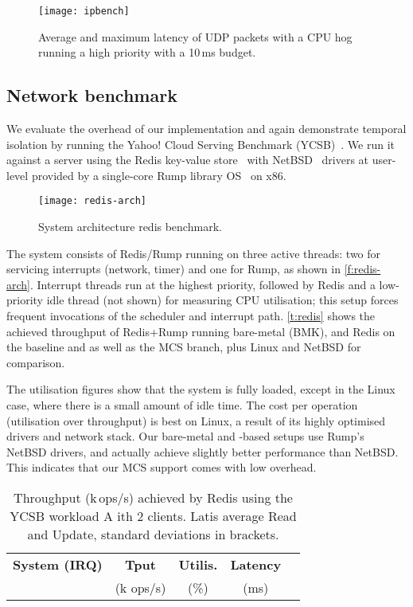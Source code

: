 \begin{figure}[b]
  \centering
  \texttt{[image: ipbench]}
  \caption{Average and maximum latency of UDP packets with a CPU hog running a high priority with a 10\,ms budget.}
  \label{f:ipbench}
\end{figure}


\subsection{Network benchmark} 

We evaluate the overhead of our implementation and
again demonstrate temporal isolation by running the Yahoo! Cloud Serving Benchmark
(YCSB)~\citep{Cooper_STRS_10}.
 We run it against a server using the Redis
 key-value store~\citep{redis:url} with NetBSD~\citep{NetBSD:url} drivers at user-level provided
 by a single-core Rump library OS~\citep{Kantee_Cormack_14} on x86.

 \begin{figure}[t]
    \centering
    \texttt{[image: redis-arch]}
    \caption{System architecture redis benchmark.}
    \label{f:redis-arch}
\end{figure}

The system consists of Redis/Rump running on three active \selfour threads: two for servicing interrupts
(network, timer) and one for Rump, as shown in \autoref{f:redis-arch}.
Interrupt threads run at the highest priority, followed by Redis and
a low-priority idle thread (not shown) for measuring CPU utilisation;
this setup forces frequent invocations of the scheduler and interrupt
path. \autoref{t:redis} shows the achieved throughput of Redis+Rump
running  bare-metal (BMK), and Redis on the \selfour baseline and as well as the MCS
branch, plus Linux and NetBSD for comparison.

The utilisation figures show that the system is fully loaded, except
in the Linux case, where there is a small amount of idle time. The
cost per operation (utilisation over throughput) is best on Linux, a
result of its highly optimised drivers and network stack. Our
bare-metal and \selfour-based setups use Rump's NetBSD drivers, and
actually achieve slightly better performance than NetBSD. This
indicates that our MCS support comes with low overhead.


\begin{table}[t]\centering
      \begin{tabular}{|c|c|c|c|c|}
        \hline
        \textbf{System (IRQ)}  & \textbf{Tput} & \textbf{Utilis.} &  \textbf{Latency} \\
                               & (k ops/s)     &  (\%)            &   (ms)            \\
        \hline
      
    \end{tabular}
    \caption{Throughput (k\,ops/s) achieved by Redis using the YCSB
      workload A ith 2 clients.  Latis average Read and Update,
      standard deviations in brackets.}
    \label{t:redis}
\end{table}

